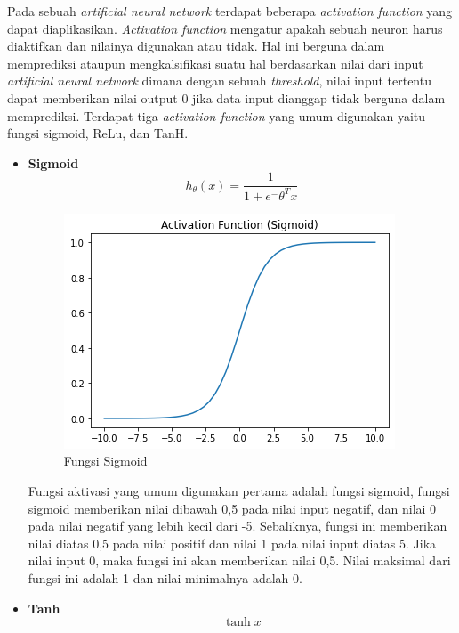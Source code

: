Pada sebuah \textit{artificial neural network} terdapat beberapa \textit{activation function} yang 
dapat diaplikasikan. \textit{Activation function} mengatur apakah sebuah neuron harus diaktifkan dan nilainya
digunakan atau tidak. Hal ini berguna dalam memprediksi ataupun mengkalsifikasi suatu hal berdasarkan
nilai dari input \textit{artificial neural network} dimana dengan sebuah \textit{threshold}, nilai input
tertentu dapat memberikan nilai output 0 jika data input dianggap tidak berguna dalam memprediksi. Terdapat tiga \textit{activation function} yang umum digunakan yaitu fungsi sigmoid, ReLu, dan TanH.

\begin{itemize}
    \item \textbf{Sigmoid}
    \begin{equation}
        h_ \theta (x) =  \frac{\mathrm{1} }{\mathrm{1} + e^- \theta^Tx }
    \end{equation}

    \begin{figure}[h!]
        \begin{center}
          \includegraphics[width= 0.5\linewidth]{bab2/21. sigmoid.png}
          \caption{Fungsi Sigmoid}
          \label{fig: Sigmoid}
        \end{center}
    \end{figure}

    Fungsi aktivasi yang umum digunakan pertama adalah fungsi sigmoid, fungsi sigmoid memberikan
    nilai dibawah 0,5 pada nilai input negatif, dan nilai 0 pada nilai negatif yang lebih kecil dari
    -5. Sebaliknya, fungsi ini memberikan nilai diatas 0,5 pada nilai positif dan nilai 1 pada nilai
    input diatas 5. Jika nilai input 0, maka fungsi ini akan memberikan nilai 0,5. Nilai maksimal dari fungsi
    ini adalah 1 dan nilai minimalnya adalah 0.

    \item \textbf{Tanh}
    \begin{equation}
        \tanh{x}
    \end{equation}


\end{itemize}
